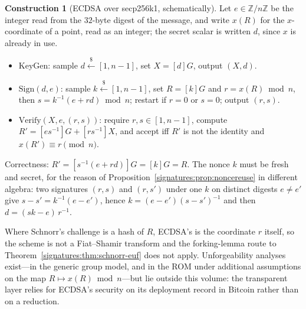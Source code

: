 \documentclass[11pt,a4paper]{article}
\theoremstyle{definition}
\newtheorem{construction}[theorem]{Construction}
\theoremstyle{remark}
\newcommand{\Z}{\ensuremath{\mathbb{Z}}}
\begin{document}
\begin{construction}[ECDSA over secp256k1, schematically]
\label{signatures:con:ecdsa}
Let \(e \in \Z/n\Z\) be the integer read from the \(32\)-byte digest
of the message, and write \(x(R)\) for the \(x\)-coordinate of a
point, read as an integer; the secret scalar is written \(d\), since
\(x\) is already in use.
\begin{itemize}
\item \(\mathrm{KeyGen}\): sample \(d \xleftarrow{\$} [1, n-1]\), set
  \(X = [d]G\), output \((X, d)\).
\item \(\mathrm{Sign}(d, e)\): sample \(k \xleftarrow{\$} [1, n-1]\),
  set \(R = [k]G\) and \(r = x(R) \bmod n\), then
  \(s = k^{-1}(e + r d) \bmod n\); restart if \(r = 0\) or \(s = 0\);
  output \((r, s)\).
\item \(\mathrm{Verify}(X, e, (r, s))\): require
  \(r, s \in [1, n-1]\), compute
  \(R' = [e s^{-1}]G + [r s^{-1}]X\), and accept iff \(R'\) is not
  the identity and \(x(R') \equiv r \pmod n\).
\end{itemize}
Correctness: \(R' = [s^{-1}(e + rd)]G = [k]G = R\). The nonce \(k\)
must be fresh and secret, for the reason of
Proposition~\ref{signatures:prop:noncereuse} in different algebra:
two signatures \((r, s)\) and \((r, s')\) under one \(k\) on distinct
digests \(e \ne e'\) give \(s - s' = k^{-1}(e - e')\), hence
\(k = (e - e')(s - s')^{-1}\) and then \(d = (sk - e)\,r^{-1}\).
\end{construction}

Where Schnorr's challenge is a hash of \(R\), ECDSA's is the
coordinate \(r\) itself, so the scheme is not a Fiat--Shamir
transform and the forking-lemma route to
Theorem~\ref{signatures:thm:schnorr-euf} does not apply.
Unforgeability analyses exist---in the generic group model, and in
the ROM under additional assumptions on the map
\(R \mapsto x(R) \bmod n\)---but lie outside this volume: the
transparent layer relies for ECDSA's security on its
deployment record in Bitcoin rather than on a reduction.
\end{document}
